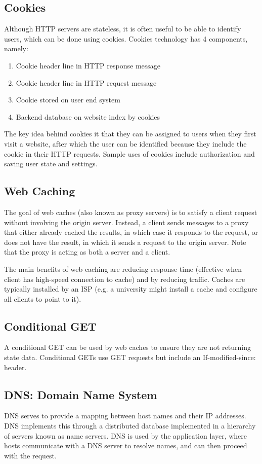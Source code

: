 \documentclass[12pt,titlepage]{article}
\begin{document}
    \subsection{Cookies}
      Although HTTP servers are stateless, it is often useful to be able to identify users, which can be done using cookies. Cookies technology has 4 components, namely:
      \begin{enumerate}
        \item Cookie header line in HTTP response message
        \item Cookie header line in HTTP request message
        \item Cookie stored on user end system
        \item Backend database on website index by cookies
      \end{enumerate}
      The key idea behind cookies it that they can be assigned to users when they first visit a website, after which the user can be identified because they include the
      cookie in their HTTP requests. Sample uses of cookies include authorization and saving user state and settings.

    \subsection{Web Caching}
      The goal of web caches (also known as proxy servers) is to satisfy a client request without involving the origin server. Instead, a client sends messages to a proxy
      that either already cached the results, in which case it responds to the request, or does not have the result, in which it sends a request to the origin server. Note
      that the proxy is acting as both a server and a client.

      The main benefits of web caching are reducing response time (effective when client has high-speed connection to cache) and by reducing traffic. Caches are typically
      installed by an ISP (e.g. a university might install a cache and configure all clients to point to it).

    \subsection{Conditional GET}
      A conditional GET can be used by web caches to ensure they are not returning state data. Conditional GETs use GET requests but include an If-modified-since: header.

    \subsection{DNS: Domain Name System}
      DNS serves to provide a mapping between host names and their IP addresses. DNS implements this through a distributed database implemented in a hierarchy of servers
      known as name servers. DNS is used by the application layer, where hosts communicate with a DNS server to resolve names, and can then proceed with the request.
\end{document}
